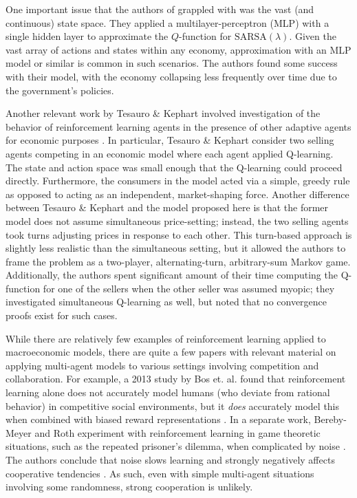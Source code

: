 \documentclass[twoside,twocolumn]{article}
\begin{document}
\medskip

One important issue that the authors of \cite{RePEc:col:000092:003907} grappled with was the vast (and continuous) state space. They applied a multilayer-perceptron (MLP) with a single hidden layer to approximate the $Q$-function for $\text{SARSA}(\lambda)$. Given the vast array of actions and states within any economy, approximation with an MLP model or similar is common in such scenarios. The authors found some success with their model, with the economy collapsing less frequently over time due to the government's policies.

\medskip

Another relevant work by Tesauro \& Kephart involved investigation of the behavior of reinforcement learning agents in the presence of other adaptive agents for economic purposes \cite{pricing-multi-agent}. In particular, Tesauro \& Kephart consider two selling agents competing in an economic model where each agent applied Q-learning. The state and action space was small enough that the Q-learning could proceed directly. Furthermore, the consumers in the model acted via a simple, greedy rule as opposed to acting as an independent, market-shaping force. Another difference between Tesauro \& Kephart and the model proposed here is that the former model does not assume simultaneous price-setting; instead, the two selling agents took turns adjusting prices in response to each other. This turn-based approach is slightly less realistic than the simultaneous setting, but it allowed the authors to frame the problem as a two-player, alternating-turn, arbitrary-sum Markov game. Additionally, the authors spent significant amount of their time computing the Q-function for one of the sellers when the other seller was assumed myopic; they investigated simultaneous Q-learning as well, but noted that no convergence proofs exist for such cases.

\medskip 

While there are relatively few examples of reinforcement learning applied to macroeconomic models, there are quite a few papers with relevant material on applying multi-agent models to various settings involving competition and collaboration. For example, a 2013 study by Bos et. al. found that reinforcement learning alone does not accurately model humans (who deviate from rational behavior) in competitive social environments, but it \textit{does} accurately model this when combined with biased reward representations \cite{vandenBos2137}. In a separate work, Bereby-Meyer and Roth experiment with reinforcement learning in game theoretic situations, such as the repeated prisoner's dilemma, when complicated by noise \cite{10.1257/aer.96.4.1029}. The authors conclude that noise slows learning and strongly negatively affects cooperative tendencies \cite{10.1257/aer.96.4.1029}. As such, even with simple multi-agent situations involving some randomness, strong cooperation is unlikely.
\end{document}
